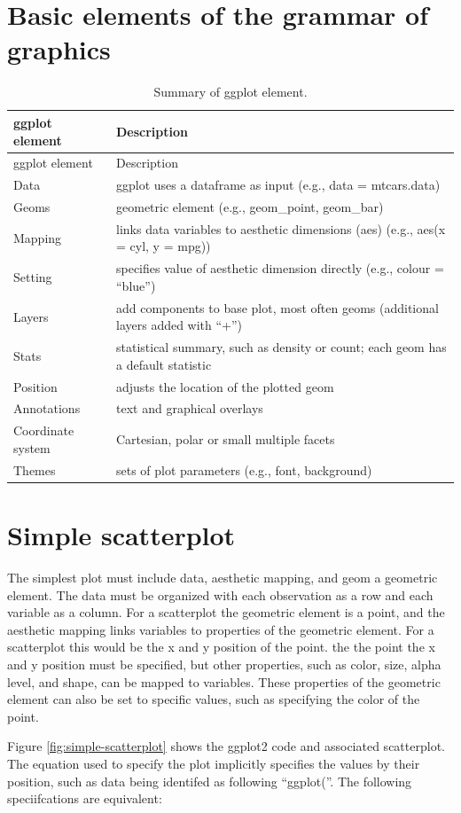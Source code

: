 \documentclass[]{krantz}
\theoremstyle{definition}
\theoremstyle{definition}
\theoremstyle{definition}
\theoremstyle{remark}
\begin{document}
\section{Basic elements of the grammar of
graphics}\label{basic-elements-of-the-grammar-of-graphics}

\begin{longtable}[]{@{}ll@{}}
\caption{\label{tab:test} Summary of ggplot element.}\tabularnewline
\toprule
ggplot element & Description\tabularnewline
\midrule
\endfirsthead
\toprule
ggplot element & Description\tabularnewline
\midrule
\endhead
Data & ggplot uses a dataframe as input (e.g., data =
mtcars.data)\tabularnewline
Geoms & geometric element (e.g., geom\_point, geom\_bar)\tabularnewline
Mapping & links data variables to aesthetic dimensions (aes) (e.g.,
aes(x = cyl, y = mpg))\tabularnewline
Setting & specifies value of aesthetic dimension directly (e.g., colour
= ``blue'')\tabularnewline
Layers & add components to base plot, most often geoms (additional
layers added with ``+'')\tabularnewline
Stats & statistical summary, such as density or count; each geom has a
default statistic\tabularnewline
Position & adjusts the location of the plotted geom\tabularnewline
Annotations & text and graphical overlays\tabularnewline
Coordinate system & Cartesian, polar or small multiple
facets\tabularnewline
Themes & sets of plot parameters (e.g., font, background)\tabularnewline
\bottomrule
\end{longtable}

\section{Simple scatterplot}\label{simple-scatterplot}

The simplest plot must include data, aesthetic mapping, and geom a
geometric element. The data must be organized with each observation as a
row and each variable as a column. For a scatterplot the geometric
element is a point, and the aesthetic mapping links variables to
properties of the geometric element. For a scatterplot this would be the
x and y position of the point. the the point the x and y position must
be specified, but other properties, such as color, size, alpha level,
and shape, can be mapped to variables. These properties of the geometric
element can also be set to specific values, such as specifying the color
of the point.

Figure \ref{fig:simple-scatterplot} shows the ggplot2 code and
associated scatterplot. The equation used to specify the plot implicitly
specifies the values by their position, such as data being identifed as
following ``ggplot(''. The following speciifcations are equivalent:
\end{document}
